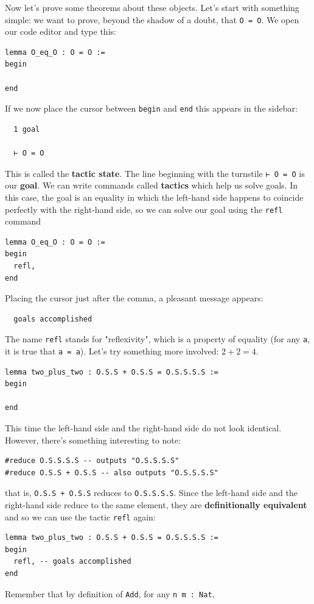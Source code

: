 \documentclass{book}
\theoremstyle{definition}
\theoremstyle{remark}
\theoremstyle{plain}
\begin{document}
Now let's prove some theorems about these objects.
Let's start with something simple: we want to prove,
beyond the shadow of a doubt, that \lstinline{O = O}.
We open our code editor and type this:
\begin{lstlisting}
lemma O_eq_O : O = O :=
begin

end
\end{lstlisting}
If we now place the cursor between \lstinline{begin} and \lstinline{end}
this appears in the sidebar:
\begin{lstlisting}
  1 goal
  
  ⊢ O = O
\end{lstlisting}
This is called the \textbf{tactic state}.
The line beginning with the turnstile \lstinline{⊢ O = O} is our \textbf{goal}.
We can write commands called \textbf{tactics} which help us solve goals.
In this case, the goal is an equality in which the left-hand side happens to coincide perfectly with the right-hand side,
so we can solve our goal using the \lstinline{refl} command
\begin{lstlisting}
lemma O_eq_O : O = O :=
begin
  refl,
end
\end{lstlisting}
Placing the cursor just after the comma, a pleasant message appears:
\begin{lstlisting}
  goals accomplished
\end{lstlisting}
The name \lstinline{refl} stands for "reflexivity",
which is a property of equality (for any \lstinline{a}, it is true that \lstinline{a = a}).
Let's try something more involved: $2 + 2 = 4$.
\begin{lstlisting}
lemma two_plus_two : O.S.S + O.S.S = O.S.S.S.S :=
begin

end
\end{lstlisting}
This time the left-hand side and the right-hand side do not look identical.
However, there's something interesting to note:
\begin{lstlisting}
#reduce O.S.S.S.S -- outputs "O.S.S.S.S"
#reduce O.S.S + O.S.S -- also outputs "O.S.S.S.S"
\end{lstlisting}
that is, \lstinline{O.S.S + O.S.S} reduces to \lstinline{O.S.S.S.S}.
Since the left-hand side and the right-hand side reduce to the same element,
they are \textbf{definitionally equivalent} and so we can use the tactic \lstinline{refl} again:
\begin{lstlisting}
lemma two_plus_two : O.S.S + O.S.S = O.S.S.S.S :=
begin
  refl, -- goals accomplished
end
\end{lstlisting}
Remember that by definition of \lstinline{Add}, for any \lstinline{n m : Nat},
\end{document}
